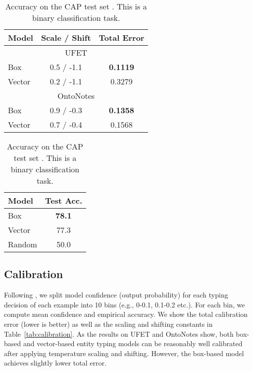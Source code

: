 \documentclass[11pt,a4paper]{article}
\begin{document}
\renewcommand{\arraystretch}{1}
\begin{table}[t]
\small
	\setlength{\tabcolsep}{4pt}
\begin{minipage}{.6\columnwidth}
	 \centering
	\begin{tabular}{l  c  c}
\toprule
		\multicolumn{1}{l}{Model} & \multicolumn{1}{l}{Scale / Shift} & \multicolumn{1}{l}{Total Error} \\
		 \midrule
 		 \multicolumn{3}{c}{UFET} \\
		 \midrule
		 Box & 0.5 / -1.1 & \textbf{0.1119}\\
         Vector & 0.2 / -1.1 &  0.3279 \\
		 \midrule
 		 \multicolumn{3}{c}{OntoNotes}\\
		 \midrule
		 Box & 0.9 / -0.3 & \textbf{0.1358}\\
         Vector & 0.7 / -0.4 & 0.1568\\
		\bottomrule 
	\end{tabular}
	\caption{Total calibration error on UFET and OntroNotes. We scale and shift logits post-hoc.}
	\label{tab:calibration}
	\end{minipage}
	\hspace{3pt}
	\begin{minipage}{.34\columnwidth}
	\vspace{-23pt}
	 \centering
		\begin{tabular}{l c}
\toprule
		\multicolumn{1}{l}{Model} & {Test Acc.}\\
		\midrule
        Box & \textbf{78.1} \\
        Vector &  77.3 \\
        Random & 50.0 \\
		\bottomrule
	\end{tabular}
	\caption{Accuracy on the CAP test set \cite{Mingda_Chen_19}. This is a binary classification task.}
	\label{tab:cap}
	\end{minipage}
\vspace{-6pt}
\end{table}



\subsection{Calibration}

Following \citet{Khanh_Nguyen_15}, we split model confidence (output probability) for each typing decision of each example into 10 bins (e.g., 0-0.1, 0.1-0.2 etc.). For each bin, we compute mean confidence and empirical accuracy. We show the total calibration error (lower is better) as well as the scaling and shifting constants in Table~\ref{tab:calibration}. As the results on UFET and OntoNotes show, both box-based and vector-based entity typing models can be reasonably well calibrated after applying temperature scaling and shifting. However, the box-based model achieves slightly lower total error. 
\end{document}
